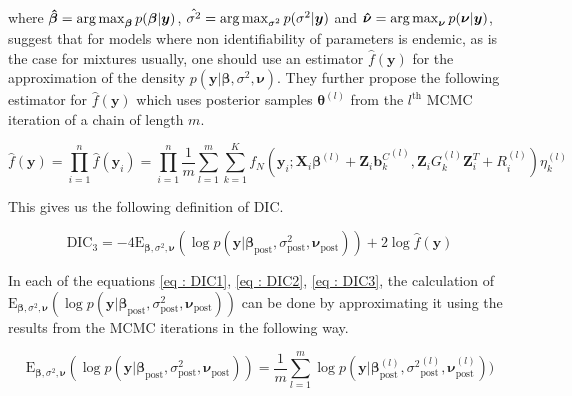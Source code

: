 where
$\boldsymbol{\hat{\beta}} = \operatorname*{arg\,max}_{\boldsymbol{\beta}}p(\boldsymbol{\beta}|\boldsymbol{y})$,
$\hat{\sigma^2} = \operatorname*{arg\,max}_{\sigma^2}p(\sigma^2|\boldsymbol{y})$ and
$\boldsymbol{\hat{\nu}} = \operatorname*{arg\,max}_{\boldsymbol{\nu}}p(\boldsymbol{\nu}|\boldsymbol{y})$,\\

\citet{celeux_deviance_2006} suggest that for models where non identifiability of parameters is endemic, as is the case for mixtures usually, one should use an estimator $\hat{f}(\boldsymbol{y})$ for the approximation of the density $p(\boldsymbol{y} | \boldsymbol{\beta}, \sigma^2, \boldsymbol{\nu})$. They further propose the following estimator for $\hat{f}(\boldsymbol{y})$ which uses posterior samples $\boldsymbol{\theta}^{(l)}$ from the $l^{\text{th}}$ MCMC iteration of a chain of length $m$.

$$\hat{f}(\boldsymbol{y}) = \prod_{i=1}^n \hat{f}(\boldsymbol{y}_i) = \prod_{i=1}^n \frac 1 m \sum_{l=1}^m \sum_{k=1}^K f_N(\boldsymbol{y}_i; \boldsymbol{X}_i\boldsymbol{\beta}^{(l)} + \boldsymbol{Z}_i {\boldsymbol{b}_k^C}^{(l)}, \boldsymbol{Z}_{i} G_k^{(l)} \boldsymbol{Z}_{i}^T+ R_i^{(l)}) \eta_k^{(l)}$$

This gives us the following definition of DIC.

\begin{equation}
\label{eq : DIC3}
\text{DIC}_3 = -4\text{E}_{\boldsymbol{\beta}, \sigma^2, \boldsymbol{\nu}}(\log{p(\boldsymbol{y}|\boldsymbol{\beta}_{\text{post}}, \sigma^2_{\text{post}}, \boldsymbol{\nu}_{\text{post}})}) + 2\log{\hat{f}(\boldsymbol{y})}
\end{equation}

In each of the equations \ref{eq : DIC1}, \ref{eq : DIC2}, \ref{eq : DIC3}, the calculation of $\text{E}_{\boldsymbol{\beta}, \sigma^2, \boldsymbol{\nu}}(\log{p(\boldsymbol{y}|\boldsymbol{\beta}_{\text{post}}, \sigma^2_{\text{post}}, \boldsymbol{\nu}_{\text{post}})})$ can be done by approximating it using the results from the MCMC iterations in the following way.

\begin{equation}
\label{eq : mean_posterior_deviance_approx}
\text{E}_{\boldsymbol{\beta}, \sigma^2, \boldsymbol{\nu}}(\log{p(\boldsymbol{y}|\boldsymbol{\beta}_{\text{post}}, \sigma^2_{\text{post}}, \boldsymbol{\nu}_{\text{post}})}) = \frac 1 m \sum_{l=1}^m\log{p(\boldsymbol{y}|\boldsymbol{\beta}^{(l)}_{\text{post}}, {\sigma^2}^{(l)}_{\text{post}}, \boldsymbol{\nu}^{(l)}_{\text{post}})})
\end{equation}

